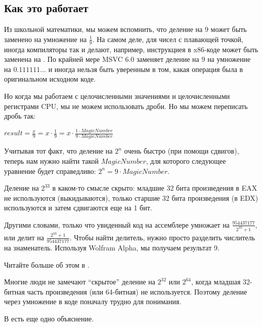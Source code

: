﻿\subsection{Как это работает}

Из школьной математики, мы можем вспомнить, что деление на 9 может быть заменено на умножение на $\frac{1}{9}$.
На самом деле, для чисел с плавающей точкой, иногда компиляторы так и делают,
например, инструкциея  в x86-коде может быть заменена на .
По крайней мере MSVC 6.0 заменяет деление на 9 на умножение на $0.111111...$ и иногда нельзя быть уверенным в том,
какая операция была в оригинальном исходном коде.

Но когда мы работаем с целочисленными значениями и целочисленными регистрами CPU, мы не можем использовать дроби.
Но мы можем переписать дробь так:

\begin{center}
$result = \frac{x}{9} = x \cdot \frac{1}{9} = x \cdot \frac{1 \cdot MagicNumber}{9 \cdot MagicNumber}$
\end{center}

Учитывая тот факт, что деление на $2^n$ очень быстро (при помощи сдвигов), теперь нам нужно найти такой $MagicNumber$,
для которого следующее уравнение будет справедливо: $2^n = 9 \cdot MagicNumber$.

Деление на $2^{33}$ в каком-то смысле скрыто: младшие 32 бита произведения в EAX не используются (выкидываются),
только старшие 32 бита произведения (в EDX) используются и затем сдвигаются еще на 1 бит.

Другими словами, только что увиденный код на ассемблере умножает на {\Large $\frac{954437177}{{2^{33}+1}}$},
или делит на {\Large $\frac{{2^{33}+1}}{954437177}$}.
Чтобы найти делитель, нужно просто разделить числитель на знаменатель.
Используя Wolfram Alpha, мы получаем результат 9.


Читайте больше об этом в .

Многие люди не замечают ``скрытое'' деление на $2^{32}$ или $2^{64}$,
когда младшая 32-битная часть произведения (или 64-битная) не используется.
Поэтому деление через умножение в коде поначалу трудно для понимания.

В \MathForProg есть еще одно объяснение.

